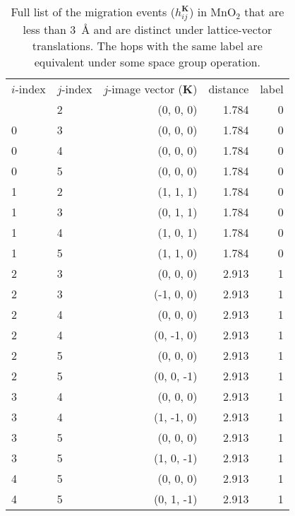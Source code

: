 \documentclass[reprint,preprintnumbers,amsmath,amssymb,aps,prl]{revtex4-1}
\begin{document}
\begin{table}
    \caption{\label{tab:mno2_mg}%
        Full list of the migration events ($h_{ij}^{\mathbf{K}}$) in MnO$_2$ that are less than 3~\AA{} and are distinct under lattice-vector translations.
        The hops with the same label are equivalent under some space group operation.
    }
    \begin{ruledtabular}
        \begin{tabular}{llrrr}
            $i$-index & $j$-index & $j$-image vector ($\mathbf{K}$) & distance & label \\
            \colrule
            0 & 2 & (0, 0, 0) & 1.784 & 0 \\
            0 & 3 & (0, 0, 0) & 1.784 & 0 \\
            0 & 4 & (0, 0, 0) & 1.784 & 0 \\
            0 & 5 & (0, 0, 0) & 1.784 & 0 \\
            1 & 2 & (1, 1, 1) & 1.784 & 0 \\
            1 & 3 & (0, 1, 1) & 1.784 & 0 \\
            1 & 4 & (1, 0, 1) & 1.784 & 0 \\
            1 & 5 & (1, 1, 0) & 1.784 & 0 \\
            2 & 3 & (0, 0, 0) & 2.913 & 1 \\
            2 & 3 & (-1, 0, 0) & 2.913 & 1 \\
            2 & 4 & (0, 0, 0) & 2.913 & 1 \\
            2 & 4 & (0, -1, 0) & 2.913 & 1 \\
            2 & 5 & (0, 0, 0) & 2.913 & 1 \\
            2 & 5 & (0, 0, -1) & 2.913 & 1 \\
            3 & 4 & (0, 0, 0) & 2.913 & 1 \\
            3 & 4 & (1, -1, 0) & 2.913 & 1 \\
            3 & 5 & (0, 0, 0) & 2.913 & 1 \\
            3 & 5 & (1, 0, -1) & 2.913 & 1 \\
            4 & 5 & (0, 0, 0) & 2.913 & 1 \\
            4 & 5 & (0, 1, -1) & 2.913 & 1 \\
        \end{tabular}
    \end{ruledtabular}
\end{table}
\end{document}
